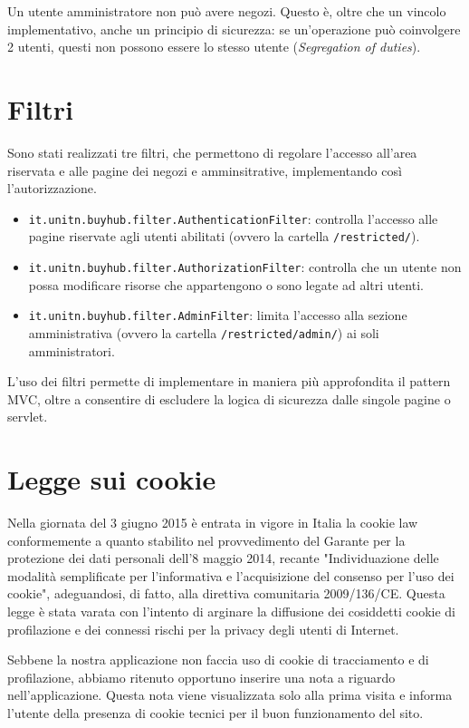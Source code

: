 Un utente amministratore non può avere negozi. Questo è, oltre che un vincolo implementativo, anche un principio di sicurezza: se un'operazione può coinvolgere 2 utenti, questi non possono essere lo stesso utente (\textit{Segregation of duties}).

\section{Filtri}
Sono stati realizzati tre filtri, che permettono di regolare l'accesso all'area riservata e alle pagine dei negozi e amminsitrative, implementando così l'autorizzazione.
\begin{itemize}
  \item \texttt{it.unitn.buyhub.filter.AuthenticationFilter}: controlla l'accesso alle pagine riservate agli utenti abilitati (ovvero la cartella \texttt{/restricted/}).
  \item \texttt{it.unitn.buyhub.filter.AuthorizationFilter}: controlla che un utente non possa modificare risorse che appartengono o sono legate ad altri utenti.
  \item \texttt{it.unitn.buyhub.filter.AdminFilter}: limita l'accesso alla sezione amministrativa  (ovvero la cartella \texttt{/restricted/admin/}) ai soli amministratori.
\end{itemize}

L'uso dei filtri permette di implementare in maniera più approfondita il pattern MVC, oltre a consentire di escludere la logica di sicurezza dalle singole pagine o servlet.

\section{Legge sui cookie}

Nella giornata del 3 giugno 2015 è entrata in vigore in Italia la cookie law conformemente a quanto stabilito nel provvedimento del Garante per la protezione dei dati personali dell'8 maggio 2014, recante "Individuazione delle modalità semplificate per l'informativa e l'acquisizione del consenso per l'uso dei cookie",  adeguandosi, di fatto, alla direttiva comunitaria 2009/136/CE. Questa legge è stata varata con l'intento di arginare la diffusione dei cosiddetti cookie di profilazione e dei connessi rischi per la privacy degli utenti di Internet.

Sebbene la nostra applicazione non faccia uso di cookie di tracciamento e di profilazione, abbiamo ritenuto opportuno inserire una nota a riguardo nell'applicazione. Questa nota viene visualizzata solo alla prima visita e informa l'utente della presenza di cookie tecnici per il buon funzionamento del sito.


